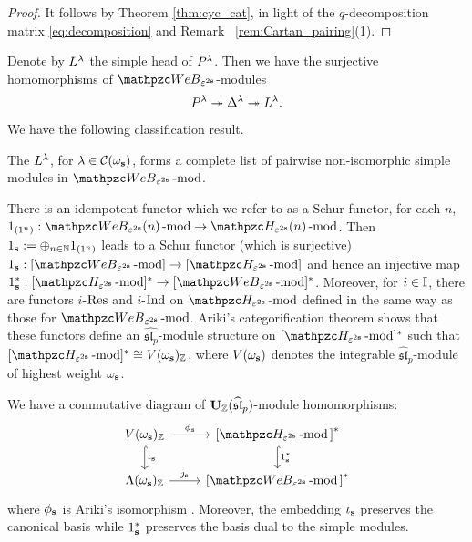 \begin{proof}
    It follows by Theorem \ref{thm:cyc_cat}, in light of the $q$-decomposition matrix \eqref{eq:decomposition} and Remark~ \ref{rem:Cartan_pairing}(1). 
\end{proof}
Denote by $L^\lambda$ the simple head of $P^\lambda$. Then we have the surjective homomorphisms of $\qW_{\eps^{2\bfs}}$-modules 
\[
P^{\lambda} \twoheadrightarrow \Delta^{\lambda} \twoheadrightarrow L^{\lambda}.
\]
We have the following classification result. 
\begin{corollary} \label{cor:classifysimple}
    The $L^\lambda$, for $\lambda \in \mathcal C(\omega_{\mathbf{s}})$, forms a complete list of pairwise non-isomorphic simple modules in $\qW_{\eps^{2\bfs}} \modf$. 
\end{corollary}

There is an idempotent functor which we refer to as a Schur functor, for each $n$, $1_{(1^n)}: \qW_{\eps^{2\bfs}}(n)\modf \rightarrow \HH_{\eps^{2\bfs}}(n)\modf$. Then  $1_{\mathbf{s}}: =\oplus_{n\in \mathbb{N}}1_{(1^n)}$ leads to a Schur functor (which is surjective) $1_\bfs: [ \qW_{\eps^{2\bfs}}\modf]
\rightarrow [\HH_{\eps^{2\bfs}}\modf]$
and hence an injective map 
$1_\bfs^*:[\HH_{\eps^{2\bfs}}\modf]^*\rightarrow [ \qW_{\eps^{2\bfs}}\modf]^*$. Moreover, for $i\in \mathbb{I}$, there are functors $i$-$\operatorname{Res}\nolimits$ and $i$-$\operatorname{Ind}\nolimits$ on $\HH_{\eps^{2\bfs}}\modf$ \cite{Ar96} defined in the same way as those for $ \qW_{\eps^{2\bfs}}\modf$. Ariki's categorification theorem \cite[Theorem 4.4]{Ar96} shows that these functors define an $\widehat{\mathfrak{sl}_p}$-module structure on
$[\HH_{\eps^{2\bfs}}\modf]^*$ such that $[\HH_{\eps^{2\bfs}}\modf]^*\cong V(\omega_\bfs)_\Z$, where $V(\omega_{\mathbf{s}})$ denotes the integrable  $\widehat{\mathfrak{sl}}_p$-module of highest weight $\omega_{\mathbf{s}}$. 

\begin{proposition} 
\label{prop:SchurHecke}
We have a commutative diagram of $\bold{U}_{\mathbb{Z}}(\widehat{\mathfrak{sl}}_p)$-module homomorphisms:
\begin{equation}   \label{CD:HeckeWeb}
\begin{tikzcd}
V (\omega_\bfs)_\Z \ar[d,hook,"\iota_\bfs"]\ar[r,"\phi_\bfs"] &{[}\HH_{\eps^{2\bfs}}\modf {]}^*\ar[d,hook,"1_\bfs^*"] \\
\Lambda (\omega_\bfs)_\Z  \ar[r,"\jmath_\bfs"]& {[}\qW_{\eps^{2\bfs}} \modf{]}^* 
\end{tikzcd} 
\end{equation}
where $\phi_{\mathbf{s}}$ is Ariki's isomorphism \cite{Ar96}. Moreover, the embedding $\iota_{\mathbf{s}}$ preserves the canonical basis while $1_{\mathbf{s}}^*$ preserves the basis dual to the simple modules. 
\end{proposition}

